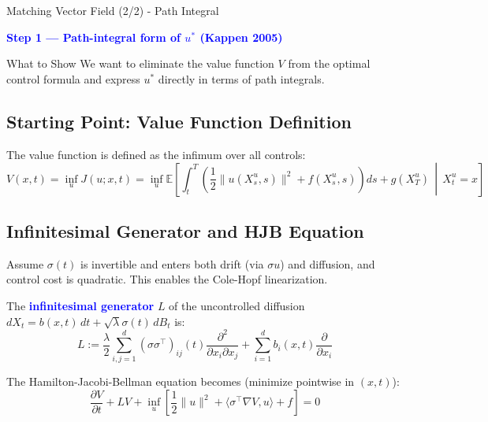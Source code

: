 \documentclass[aspectratio=169,xcolor=dvipsnames]{beamer}
\begin{document}
\begin{frame}[allowframebreaks]{Matching Vector Field (2/2) - Path Integral}
    \vspace{-0.3cm}
    
    \begin{center}
        \Large\textcolor{blue}{\textbf{Step 1 — Path-integral form of $u^*$ (Kappen 2005)}}
    \end{center}
    
    \vspace{0.3cm}
    
    \begin{block}{What to Show}
        We want to eliminate the value function $V$ from the optimal control formula and express $u^*$ directly in terms of path integrals.
    \end{block}
    
    \vspace{0.5cm}
    
    \subsection*{Starting Point: Value Function Definition}
    
    The value function is defined as the infimum over all controls:
    $$V(x,t) = \inf_u J(u; x,t) = \inf_u \mathbb{E}\left[\int_t^T \left(\frac{1}{2}\|u(X_s^u, s)\|^2 + f(X_s^u, s)\right) ds + g(X_T^u) \,\middle|\, X_t^u = x\right]$$
    
    \vspace{0.5cm}
    
    \subsection*{Infinitesimal Generator and HJB Equation}
    
    Assume $\sigma(t)$ is invertible and enters both drift (via $\sigma u$) and diffusion, and control cost is quadratic. This enables the Cole-Hopf linearization.
    
    The \textcolor{blue}{\textbf{infinitesimal generator}} $L$ of the uncontrolled diffusion $dX_t = b(x,t) \, dt + \sqrt{\lambda} \sigma(t) \, dB_t$ is:
    $$L := \frac{\lambda}{2} \sum_{i,j=1}^d (\sigma\sigma^\top)_{ij}(t) \frac{\partial^2}{\partial x_i \partial x_j} + \sum_{i=1}^d b_i(x,t) \frac{\partial}{\partial x_i}$$
    
    The Hamilton-Jacobi-Bellman equation becomes (minimize pointwise in $(x,t)$):
    $$\frac{\partial V}{\partial t} + LV + \inf_u \left[\frac{1}{2}\|u\|^2 + \langle\sigma^\top \nabla V, u\rangle + f\right] = 0$$
    

\end{frame}
\end{document}
